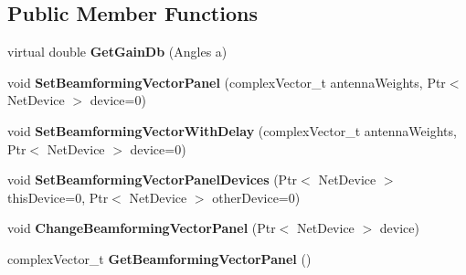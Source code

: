 \subsection*{Public Member Functions}
\begin{DoxyCompactItemize}
\item 
\mbox{\label{classns3_1_1millicar_1_1MmWaveVehicularAntennaArrayModel_a9613fa40bea2b327c7f988d32c565011}} 
virtual double {\bfseries Get\+Gain\+Db} (Angles a)
\item 
\mbox{\label{classns3_1_1millicar_1_1MmWaveVehicularAntennaArrayModel_ae655e771ff32627633d3022dd5e9d2b0}} 
void {\bfseries Set\+Beamforming\+Vector\+Panel} (complex\+Vector\+\_\+t antenna\+Weights, Ptr$<$ Net\+Device $>$ device=0)
\item 
\mbox{\label{classns3_1_1millicar_1_1MmWaveVehicularAntennaArrayModel_a18cc7940ab4c2ff4792ff1190abdd31e}} 
void {\bfseries Set\+Beamforming\+Vector\+With\+Delay} (complex\+Vector\+\_\+t antenna\+Weights, Ptr$<$ Net\+Device $>$ device=0)
\item 
\mbox{\label{classns3_1_1millicar_1_1MmWaveVehicularAntennaArrayModel_a11638107e20004a64b705d065836efa4}} 
void {\bfseries Set\+Beamforming\+Vector\+Panel\+Devices} (Ptr$<$ Net\+Device $>$ this\+Device=0, Ptr$<$ Net\+Device $>$ other\+Device=0)
\item 
\mbox{\label{classns3_1_1millicar_1_1MmWaveVehicularAntennaArrayModel_ab12886777ec5ad1263929feb384532ec}} 
void {\bfseries Change\+Beamforming\+Vector\+Panel} (Ptr$<$ Net\+Device $>$ device)
\item 
\mbox{\label{classns3_1_1millicar_1_1MmWaveVehicularAntennaArrayModel_aba8ce056f2e0df98d2ba75980ff0af7e}} 
complex\+Vector\+\_\+t {\bfseries Get\+Beamforming\+Vector\+Panel} ()
\item 
\mbox{\label{classns3_1_1millicar_1_1MmWaveVehicularAntennaArrayModel_abb1c4f0625fd0568b3b493f3ffe4dd04}} 

\end{DoxyCompactItemize}
